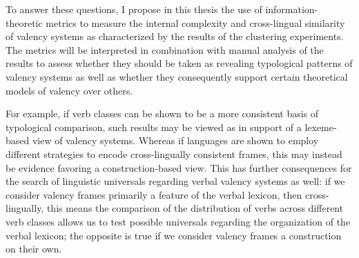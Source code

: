 To answer these questions, I propose in this thesis the use of information-theoretic metrics to measure the internal complexity and cross-lingual similarity of valency systems as characterized by the results of the clustering experiments. The metrics will be interpreted in combination with manual analysis of the results to assess whether they should be taken as revealing typological patterns of valency systems as well as whether they consequently support certain theoretical models of valency over others. 

For example, if verb classes can be shown to be a more consistent basis of typological comparison, such results may be viewed as in support of a lexeme-based view of valency systems. Whereas if languages are shown to employ different strategies to encode cross-lingually consistent frames, this may instead be evidence favoring a construction-based view. This has further consequences for the search of linguistic universals regarding verbal valency systems as well: if we consider valency frames primarily a feature of the verbal lexicon, then cross-lingually, this means the comparison of the distribution of verbs across different verb classes allows us to test possible universals regarding the organization of the verbal lexicon; the opposite is true if we consider valency frames a construction on their own.